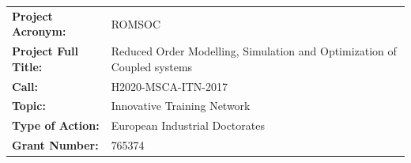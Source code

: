 \documentclass{ROMSOC}
\begin{document}
\clearpage

\setlength{\headheight}{1cm}
\setlength{\footskip}{18mm}
\addtolength{\textheight}{-\footskip}
\pagestyle{empty}

\begin{flushleft}
  \begin{tabular}{ll}
    \textbf{Project Acronym:}       &  ROMSOC \\
    \textbf{Project Full Title:}    &  Reduced Order Modelling, Simulation and Optimization of Coupled systems  \\
    \textbf{Call:}                  &  H2020-MSCA-ITN-2017 \\ 
    \textbf{Topic:}                 &  Innovative Training Network \\
    \textbf{Type of Action:}        &  European Industrial Doctorates \\
    \textbf{Grant Number:}          &   765374 \\
  \end{tabular}


\newcommand\Tstrut{\rule{0pt}{2.6ex}}         %
\newcommand\Bstrut{\rule[-0.9ex]{0pt}{0pt}}   %


\end{flushleft}
\end{document}
